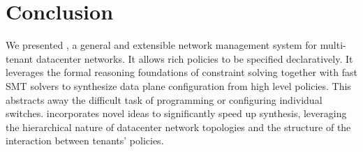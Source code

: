 \section{Conclusion}

We presented \Name, a general and extensible network management system
for multi-tenant datacenter networks. It allows rich policies to be
specified declaratively. It leverages the formal reasoning foundations
of constraint solving together with fast SMT solvers to synthesize
data plane configuration from high level policies. This abstracts away
the difficult task of programming or configuring individual
switches. \Name incorporates novel ideas to significantly speed up
synthesis, leveraging the hierarchical nature of datacenter network
topologies and the structure of the interaction between tenants'
policies.


